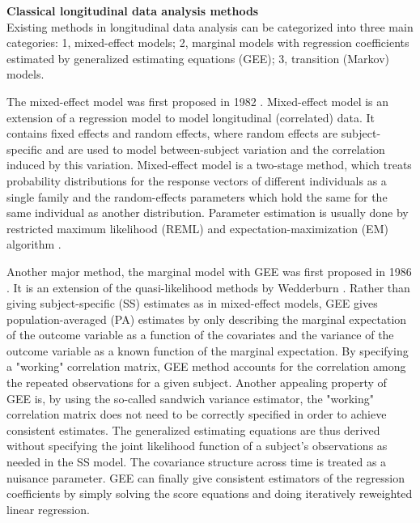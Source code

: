 \documentclass[12pt]{article}
\begin{document}
\textbf{Classical longitudinal data analysis methods}\\
Existing methods in longitudinal data analysis can be categorized into three main categories: 1, mixed-effect models; 2, marginal models with regression coefficients estimated by generalized estimating equations (GEE); 3, transition (Markov) models. 

The mixed-effect model was first proposed in 1982 \cite{laird1982random}. Mixed-effect model is an extension of a regression model to model longitudinal (correlated) data. It contains fixed effects and random effects, where random effects are subject-specific and are used to model between-subject variation and the correlation induced by this variation. Mixed-effect model is a two-stage method, which treats probability distributions for the response vectors of different individuals as a single family and the random-effects parameters which hold the same for the same individual as another distribution. Parameter estimation is usually done by restricted maximum likelihood (REML) and expectation-maximization (EM) algorithm \cite{laird1982random}. 

Another major method, the marginal model with GEE was first proposed in 1986 \cite{zeger1986longitudinal,liang1986longitudinal}. It is an extension of the quasi-likelihood methods by Wedderburn \cite{wedderburn1974quasi}. Rather than giving subject-specific (SS) estimates as in mixed-effect models, GEE gives population-averaged (PA) estimates by only describing the marginal expectation of the outcome variable as a function of the covariates and the variance of the outcome variable as a known function of the marginal expectation. By specifying a "working" correlation matrix, GEE method accounts for the correlation among the repeated observations for a given subject. Another appealing property of GEE is, by using the so-called sandwich variance estimator, the "working" correlation matrix does not need to be correctly specified in order to achieve consistent estimates. The generalized estimating equations are thus derived without specifying the joint likelihood function of a subject's observations as needed in the SS model. The covariance structure across time is treated as a nuisance parameter. GEE can finally give consistent estimators of the regression coefficients by simply solving the score equations and doing iteratively reweighted linear regression. 
\end{document}
